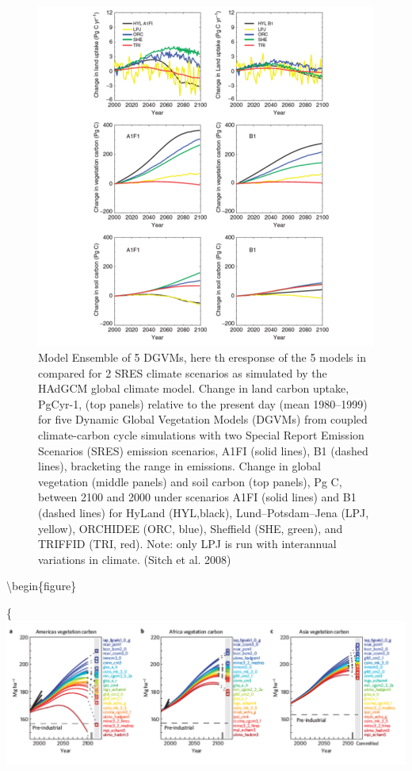 \documentclass[12pt,oneside]{book}
\begin{document}
\begin{figure}

{\centering \includegraphics[width=0.8\linewidth]{figures/chap10/f10_10_sitch_ensemble} 

}

\caption{Model Ensemble of 5 DGVMs, here th eresponse of the 5 models in compared for 2 SRES climate scenarios as simulated by the HAdGCM global climate model. Change in land carbon uptake, PgCyr-1, (top panels) relative to the present day (mean 1980–1999) for five Dynamic Global Vegetation Models (DGVMs) from coupled climate-carbon cycle simulations with two Special Report Emission Scenarios (SRES) emission scenarios, A1FI (solid lines), B1 (dashed lines), bracketing the range in emissions. Change in global vegetation (middle panels) and soil carbon (top panels), Pg C, between 2100 and 2000 under scenarios A1FI (solid lines) and B1 (dashed lines) for HyLand (HYL,black), Lund–Potsdam–Jena (LPJ, yellow), ORCHIDEE (ORC, blue), Sheffield (SHE, green), and TRIFFID (TRI, red). Note: only LPJ is run with interannual variations in climate. (Sitch et al. 2008)}\label{fig:f1010}
\end{figure}

\textbackslash{}begin\{figure\}

\{\centering \includegraphics[width=0.8\linewidth]{figures/chap10/f10_11_huntingford}
\end{document}
